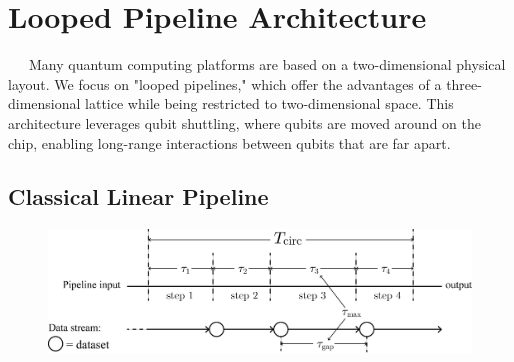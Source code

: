 \documentclass[a4paper,11pt]{ltjsarticle}
\begin{document}
\section{Looped Pipeline Architecture}{
    \ \ \ Many quantum computing platforms are based on a two-dimensional physical layout. We focus on "looped pipelines," \cite{cai2023} which offer the advantages of a three-dimensional lattice while being restricted to two-dimensional space. This architecture leverages qubit shuttling, where qubits are moved around on the chip, enabling long-range interactions between qubits that are far apart. 

    \subsection{Classical Linear Pipeline}{

        \begin{figure}[h]
            \centering
            \includegraphics[scale=0.40]{figure/classical_pipeline.eps}
            \vspace{-20pt}\caption{}
            \label{classical_pipeline}
            \vspace{-10pt}
        \end{figure}

}}
\end{document}
